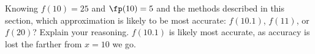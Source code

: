 {Knowing $f(10)=25$ and $\fp(10) = 5$ and the methods described in this section, which approximation is likely to be most accurate: $f(10.1)$, $f(11)$, or $f(20)$? Explain your reasoning.
}
{$f(10.1)$ is likely most accurate, as accuracy is lost the farther from $x=10$ we go.
}
